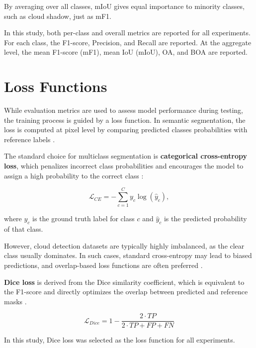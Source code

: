 By averaging over all classes, mIoU gives equal importance to minority classes, such as cloud shadow, just as mF1.

In this study, both per-class and overall metrics are reported for all experiments. For each class, the F1-score, Precision, and Recall are reported. At the aggregate level, the mean F1-score (mF1), mean IoU (mIoU), OA, and BOA are reported.


\section{Loss Functions}
\label{sec:loss_functions}

While evaluation metrics are used to assess model performance during testing, the training process is guided by a loss function. In semantic segmentation, the loss is computed at pixel level by comparing predicted classes probabilities with reference labels \cite{goodfellow2016}.

The standard choice for multiclass segmentation is \textbf{categorical cross-entropy loss}, which penalizes incorrect class probabilities and encourages the model to assign a high probability to the correct class \cite{goodfellow2016}:

\begin{equation}
\mathcal{L}_{CE} = - \sum_{c=1}^{C} y_c \log(\hat{y}_c),
\end{equation}

where $y_c$ is the ground truth label for class $c$ and $\hat{y}_c$ is the predicted probability of that class.

However, cloud detection datasets are typically highly imbalanced, as the clear class usually dominates. In such cases, standard cross-entropy may lead to biased predictions, and overlap-based loss functions are often preferred \cite{milletari2016}.

\textbf{Dice loss} is derived from the Dice similarity coefficient, which is equivalent to the F1-score and directly optimizes the overlap between predicted and reference masks \cite{milletari2016}.

\begin{equation}
\mathcal{L}_{Dice} = 1 - \frac{2\cdot TP}{2\cdot TP + FP + FN}
\end{equation}

In this study, Dice loss was selected as the loss function for all experiments.